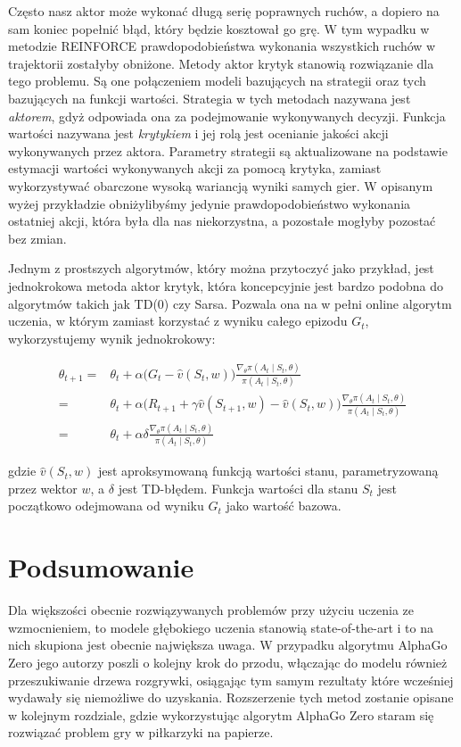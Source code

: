 \documentclass[licencjacka]{pracamgr}
\begin{document}
Często nasz aktor może wykonać długą serię poprawnych ruchów, a dopiero na sam koniec popełnić błąd, który będzie kosztował go grę. W tym wypadku w metodzie REINFORCE prawdopodobieństwa wykonania wszystkich ruchów w trajektorii zostałyby obniżone. Metody aktor krytyk stanowią rozwiązanie dla tego problemu. Są one połączeniem modeli bazujących na strategii oraz tych bazujących na funkcji wartości. Strategia w tych metodach nazywana jest \emph{aktorem}, gdyż odpowiada ona za podejmowanie wykonywanych decyzji. Funkcja wartości nazywana jest \emph{krytykiem} i jej rolą jest ocenianie jakości akcji wykonywanych przez aktora. Parametry strategii są aktualizowane na podstawie estymacji wartości wykonywanych akcji za pomocą krytyka, zamiast wykorzystywać obarczone wysoką wariancją wyniki samych gier. W opisanym wyżej przykładzie obniżylibyśmy jedynie prawdopodobieństwo wykonania ostatniej akcji, która była dla nas niekorzystna, a pozostałe mogłyby pozostać bez zmian.

Jednym z prostszych algorytmów, który można przytoczyć jako przykład, jest jednokrokowa metoda aktor krytyk, która koncepcyjnie jest bardzo podobna do algorytmów takich jak TD(0) czy Sarsa. Pozwala ona na w pełni online algorytm uczenia, w którym zamiast korzystać z wyniku całego epizodu $G_t$, wykorzystujemy wynik jednokrokowy:

\begin{align*}
\theta_{t+1} =& \theta_t + \alpha \Big( G_t - \hat{v}(S_t, w) \Big) \frac{\nabla_\theta \pi(A_t \mid S_t, \theta)}{\pi(A_t \mid S_t, \theta)} \\
=& \theta_t + \alpha \Big( R_{t+1} + \gamma \hat{v}(S_{t+1}, w) - \hat{v}(S_t, w) \Big) \frac{\nabla_\theta \pi(A_t \mid S_t, \theta)}{\pi(A_t \mid S_t, \theta)} \\
=& \theta_t + \alpha \delta \frac{\nabla_\theta \pi(A_t \mid S_t, \theta)}{\pi(A_t \mid S_t, \theta)}
\end{align*}

gdzie $ \hat{v}(S_t, w) $ jest aproksymowaną funkcją wartości stanu, parametryzowaną przez wektor $w$, a $\delta$ jest TD-błędem. Funkcja wartości dla stanu $S_t$ jest początkowo odejmowana od wyniku $G_t$ jako wartość bazowa. 

\section{Podsumowanie}

Dla większości obecnie rozwiązywanych problemów przy użyciu uczenia ze wzmocnieniem, to modele głębokiego uczenia stanowią state-of-the-art i to na nich skupiona jest obecnie największa uwaga. W przypadku algorytmu AlphaGo Zero jego autorzy poszli o kolejny krok do przodu, włączając do modelu również przeszukiwanie drzewa rozgrywki, osiągając tym samym rezultaty które wcześniej wydawały się niemożliwe do uzyskania. Rozszerzenie tych metod zostanie opisane w kolejnym rozdziale, gdzie wykorzystując algorytm AlphaGo Zero staram się rozwiązać problem gry w piłkarzyki na papierze.
\end{document}
